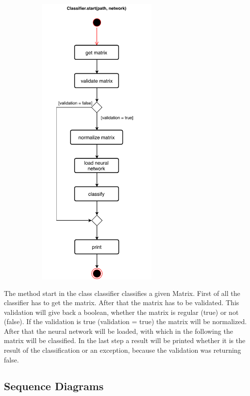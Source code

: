 \documentclass[parskip=full]{scrartcl}
\begin{document}
\begin{figure}[h]
\begin{center}
\includegraphics[width=8cm,height=15cm,keepaspectratio]{ActivityDiagrams/PDF/classification_activity_diagram.pdf}
\label{Activity Diagrams}
\end{center}
\end{figure}

\newpage
The method start in the class classifier classifies a given Matrix.
First of all the classifier has to get the matrix. 
After that the matrix has to be validated.
This validation will give back a boolean, whether the matrix is regular (true) or not (false).
If the validation is true (validation = true) the matrix will be normalized.
After that the \gls{neural network} will be loaded, with which in the following the matrix will be classified.
In the last step a result will be printed whether it is the result of the classification or an exception, because the validation was returning false.

 
\newpage
\subsection{Sequence Diagrams} 
\end{document}

